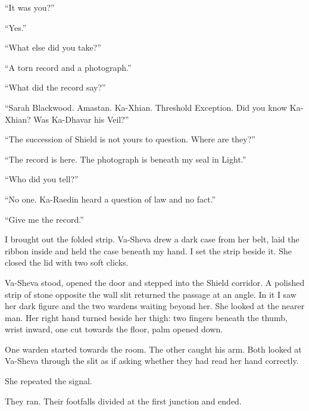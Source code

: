 ``It was you?''\par

``Yes.''\par

``What else did you take?''\par

``A torn record and a photograph.''\par

``What did the record say?''\par

``Sarah Blackwood. Amastan. Ka-Xhian. Threshold Exception. Did you know Ka-Xhian? Was Ka-Dhavar his Veil?''\par

``The succession of Shield is not yours to question. Where are they?''\par

``The record is here. The photograph is beneath my seal in Light.''\par

``Who did you tell?''\par

``No one. Ka-Raedin heard a question of law and no fact.''\par

``Give me the record.''\par

I brought out the folded strip. Va-Sheva drew a dark case from her belt, laid the ribbon inside and held the case beneath my hand. I set the strip beside it. She closed the lid with two soft clicks.\par

Va-Sheva stood, opened the door and stepped into the Shield corridor. A polished strip of stone opposite the wall slit returned the passage at an angle. In it I saw her dark figure and the two wardens waiting beyond her. She looked at the nearer man. Her right hand turned beside her thigh: two fingers beneath the thumb, wrist inward, one cut towards the floor, palm opened down.\par

One warden started towards the room. The other caught his arm. Both looked at Va-Sheva through the slit as if asking whether they had read her hand correctly.\par

She repeated the signal.\par

They ran. Their footfalls divided at the first junction and ended.\par

